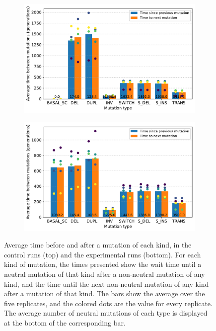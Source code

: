\begin{figure}
  \begin{subfigure}[t]{\textwidth}
    \includegraphics[width=\textwidth]{aevol/images/epistasis_control.pdf}
  \end{subfigure}
  \begin{subfigure}[t]{\textwidth}
    \includegraphics[width=\textwidth]{aevol/images/epistasis_sc.pdf}
  \end{subfigure}
  \caption[Measuring epistasis with the average times before and after mutations]{Average time before and after a mutation of each kind, in the control runs (top) and the experimental runs (bottom).
  For each kind of mutation, the times presented show the wait time until a neutral mutation of that kind after a non-neutral mutation of any kind, and the time until the next non-neutral mutation of any kind after a mutation of that kind.
  The bars show the average over the five replicates, and the colored dots are the value for every replicate.
  The average number of neutral mutations of each type is displayed at the bottom of the corresponding bar.}
  \label{fig:aevol:epistasis}
\end{figure}

